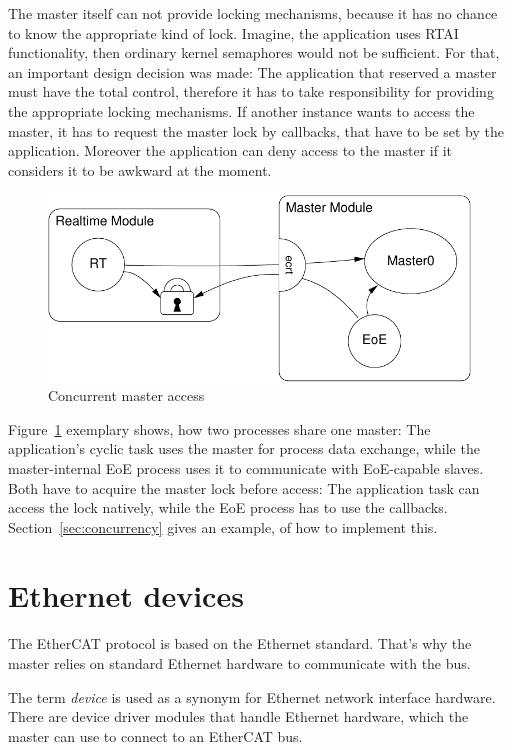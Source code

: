 \documentclass[a4paper,12pt,BCOR6mm,bibtotoc,idxtotoc]{scrbook}
\begin{document}
The master itself can not provide locking mechanisms, because it has no chance
to know the appropriate kind of lock. Imagine, the application uses RTAI
functionality, then ordinary kernel semaphores would not be sufficient. For
that, an important design decision was made: The application that reserved a
master must have the total control, therefore it has to take responsibility for
providing the appropriate locking mechanisms. If another instance wants to
access the master, it has to request the master lock by callbacks, that have to
be set by the application. Moreover the application can deny access to the
master if it considers it to be awkward at the moment.

\begin{figure}[htbp]
  \centering
  \includegraphics[width=.6\textwidth]{images/master-locks}
  \caption{Concurrent master access}
  \label{fig:locks}
\end{figure}

Figure~\ref{fig:locks} exemplary shows, how two processes share one master: The
application's cyclic task uses the master for process data exchange, while the
master-internal EoE process uses it to communicate with EoE-capable slaves.
Both have to acquire the master lock before access: The application task can
access the lock natively, while the EoE process has to use the callbacks.
Section~\ref{sec:concurrency} gives an example, of how to implement this.


\chapter{Ethernet devices}
\label{sec:devices}

The EtherCAT protocol is based on the Ethernet standard. That's why the master
relies on standard Ethernet hardware to communicate with the bus.

The term \textit{device} is used as a synonym for Ethernet network interface
hardware. There are device driver modules that handle Ethernet hardware, which
the master can use to connect to an EtherCAT bus.
\end{document}
